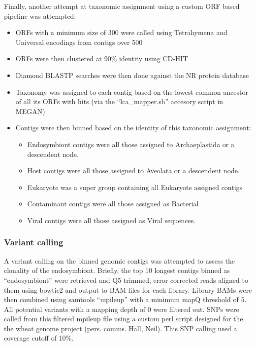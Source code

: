 Finally, another attempt at taxonomic assignment using a custom ORF based pipeline was attempted:
\begin{itemize}
    \item ORFs with a minimum size of 300 were called using Tetrahymena and Universal encodings from contigs over \SI{500}{\bp} 
    \item ORFs were then clustered at 90\% identity using CD-HIT
    \item Diamond BLASTP searches were then done against the NR protein database
    \item Taxonomy was assigned to each contig based on the lowest common ancestor of all its
        ORFs with hits (via the ``lca\_mapper.sh'' accesory script in MEGAN)
    \item Contigs were then binned based on the identity of this taxonomic assignment:
        \begin{itemize}
            \item Endosymbiont contigs were all those assigned to Archaeplastida or a descendent node.
            \item Host contigs were all those assigned to Aveolata or a descendent node.
            \item Eukaryote was a super group containing all Eukaryote assigned contigs
            \item Contaminant contigs were all those assigned as Bacterial
            \item Viral contigs were all those assigned as Viral sequences. 
        \end{itemize}
\end{itemize}

\subsubsection{Variant calling}

A variant calling on the binned genomic contigs was attempted 
to assess the clonality of the endosymbiont. 
Briefly, the top 10 longest contigs binned as ``endosymbiont'' 
were retrieved and Q5 trimmed, error corrected reads aligned
to them using bowtie2 and output to BAM files for each library.
Library BAMs were then combined using samtools ``mpileup''
with a minimum mapQ threshold of 5.  All potential variants
with a mapping depth of 0 were filtered out.
SNPs were called from this filtered mpileup file
using a custom perl script designed for the 
the wheat genome project (pers. comms. Hall, Neil).
This SNP calling used a coverage cutoff of 10\%.


